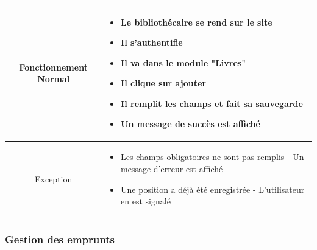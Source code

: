 \par 
\begin{tabular}{|c|p{7cm}|}
        \hline
        Fonctionnement Normal & \begin{itemize}
                \item Le bibliothécaire se rend sur le site
                \item Il s'authentifie
                \item Il va dans le module "Livres"
                \item Il clique sur ajouter
                \item Il remplit les champs et fait sa sauvegarde
                \item Un message de succès est affiché
        \end{itemize} \\
        \hline
        Exception & \begin{itemize}
                \item Les champs obligatoires ne sont pas remplis - Un message d'erreur est affiché
                \item Une position a déjà été enregistrée - L'utilisateur en est signalé
        \end{itemize} \\
        \hline
\end{tabular}

\subsubsection{Gestion des emprunts} 
